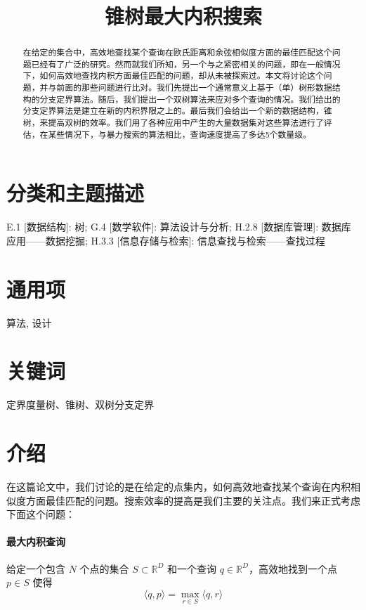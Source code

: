 \documentclass[twocolumn,a4paper]{article}
\begin{document}
\title{锥树最大内积搜索}
\maketitle

\begin{abstract}
在给定的集合中，高效地查找某个查询在欧氏距离和余弦相似度方面的最佳匹配这个问题已经有了广泛的研究。然而就我们所知，另一个与之紧密相关的问题，即在一般情况下，如何高效地查找内积方面最佳匹配的问题，却从未被探索过。本文将讨论这个问题，并与前面的那些问题进行比对。我们先提出一个通常意义上基于（单）树形数据结构的分支定界算法。随后，我们提出一个双树算法来应对多个查询的情况。我们给出的分支定界算法是建立在新的内积界限之上的。最后我们会给出一个新的数据结构，锥树，来提高双树的效率。我们用了各种应用中产生的大量数据集对这些算法进行了评估，在某些情况下，与暴力搜索的算法相比，查询速度提高了多达5个数量级。
\end{abstract}

\section*{分类和主题描述}
E.1 [数据结构]: 树; G.4 [数学软件]: 算法设计与分析; H.2.8 [数据库管理]: 数据库应用——数据挖掘; H.3.3 [信息存储与检索]: 信息查找与检索——查找过程
\section*{通用项}
算法, 设计
\section*{关键词}
定界度量树、锥树、双树分支定界

\section{介绍}
在这篇论文中，我们讨论的是在给定的点集内，如何高效地查找某个查询在内积相似度方面最佳匹配的问题。搜索效率的提高是我们主要的关注点。我们来正式考虑下面这个问题：

\paragraph{最大内积查询} 给定一个包含 $N$ 个点的集合 $S \subset \mathbb{R}^D$ 和一个查询 $q \in \mathbb{R}^D$，高效地找到一个点 $p \in S$ 使得
\begin{equation}
\langle q,p \rangle = \max_{r \in S}\langle q,r \rangle
\end{equation}
\end{document}
